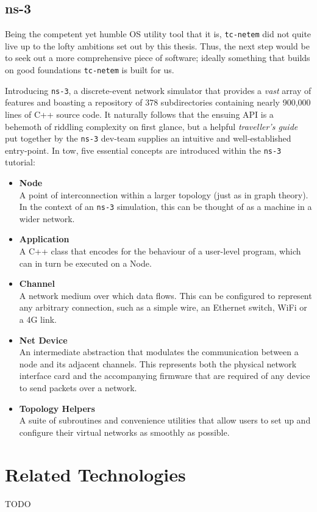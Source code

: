 \subsection{ns-3}

Being the competent yet humble OS utility tool that it is, \texttt{tc-netem} did not quite live up to the lofty
ambitions set out by this thesis. Thus, the next step would be to seek out a more comprehensive piece of software;
ideally something that builds on good foundations \texttt{tc-netem} is built for us.

Introducing \texttt{ns-3}, a discrete-event network simulator that provides a \emph{vast} array of
features\cite{ns_3_man} and boasting a repository of 378 subdirectories containing nearly 900,000 lines of C++ source
code\cite{ns_3_gitlab}. It naturally follows that the ensuing API is a behemoth of riddling complexity on first
glance, but a helpful \emph{traveller's guide} put together by the \texttt{ns-3} dev-team supplies an intuitive and
well-established entry-point\cite{ns_3_man_pdf}. In tow, five essential concepts are introduced within the \texttt{ns-3}
tutorial:
\begin{itemize}
    \item \textbf{Node} \\
    A point of interconnection within a larger topology (just as in graph theory). In the context of an \texttt{ns-3}
    simulation, this can be thought of as a machine in a wider network.
    \item \textbf{Application} \\
    A C++ class that encodes for the behaviour of a user-level program, which can in turn be executed on a Node.
    \item \textbf{Channel} \\
    A network medium over which data flows. This can be configured to represent any arbitrary connection, such as a
    simple wire, an Ethernet switch, WiFi or a 4G link.
    \item \textbf{Net Device} \\
    An intermediate abstraction that modulates the communication between a node and its adjacent channels. This
    represents both the physical network interface card and the accompanying firmware that are required of any device
    to send packets over a network.
    \item \textbf{Topology Helpers} \\
    A suite of subroutines and convenience utilities that allow users to set up and configure their virtual networks
    as smoothly as possible.
\end{itemize}


\section{Related Technologies}

TODO
